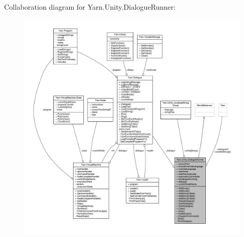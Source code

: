 Collaboration diagram for Yarn.\-Unity.\-Dialogue\-Runner\-:
\nopagebreak
\begin{figure}[H]
\begin{center}
\leavevmode
\includegraphics[width=350pt]{d5/d5b/a00695}
\end{center}
\end{figure}
